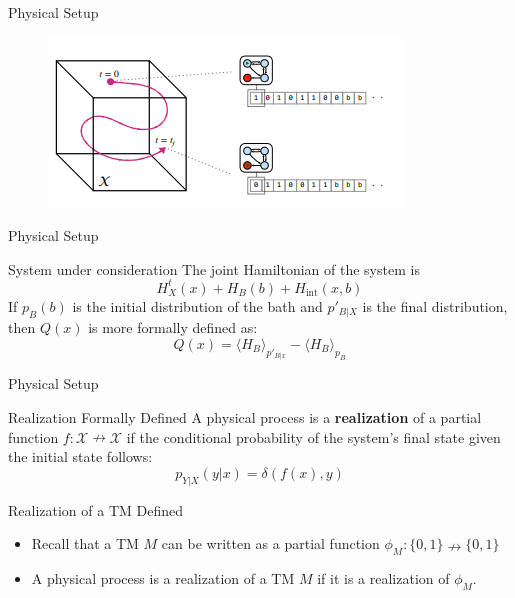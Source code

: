 \documentclass{beamer}
\begin{document}
\begin{frame}{Physical Setup}

    \begin{figure}
            \centering
            \includegraphics{System.png}
            \label{fig:my_label2}
        \end{figure}
\end{frame}

\begin{frame}{Physical Setup}
\begin{block}{System under consideration}
The joint Hamiltonian of the system is
\begin{equation*}
    H_X^t(x) + H_B(b) + H_{\text{int}}(x,b)
\end{equation*}
If $p_B(b)$ is the initial distribution of the bath and $p'_{B|X}$ is the final distribution, then $Q(x)$ is more formally defined as:
\begin{equation*}
    Q(x) = \langle H_B \rangle_{p'_{B|x}} - \langle H_B \rangle_{p_B}
\end{equation*}
\end{block}
\end{frame}

\begin{frame}{Physical Setup}
    \begin{block}{Realization Formally Defined}
    A physical process is a \textbf{realization} of a partial function $f:\mathcal{X}\nrightarrow\mathcal{X}$ if the conditional probability of the system's final state given the initial state follows:
    \begin{equation*}
        p_{Y|X}(y|x) = \delta(f(x), y)
    \end{equation*}
    \end{block}
    
\begin{block}{Realization of a TM Defined}
\begin{itemize}
    \item Recall that a TM $M$ can be written as a partial function $\phi_M:\{0,1\} \nrightarrow \{0,1\}$
    \item A physical process is a realization of a TM $M$ if it is a realization of $\phi_M$.
\end{itemize}
\end{block}
\end{frame}
\end{document}
